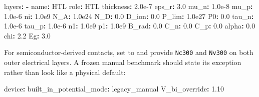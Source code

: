 \documentclass[
  11pt,
  american,
]{report}
\newenvironment{Shaded}{}{}
\newcommand{\AttributeTok}[1]{\textcolor[rgb]{0.49,0.56,0.16}{#1}}
\newcommand{\FloatTok}[1]{\textcolor[rgb]{0.25,0.63,0.44}{#1}}
\newcommand{\FunctionTok}[1]{\textcolor[rgb]{0.02,0.16,0.49}{#1}}
\newcommand{\KeywordTok}[1]{\textcolor[rgb]{0.00,0.44,0.13}{\textbf{#1}}}
\begin{document}
\begin{Shaded}
\begin{Highlighting}[]
\FunctionTok{layers}\KeywordTok{:}
\AttributeTok{  }\KeywordTok{{-}}\AttributeTok{ }\FunctionTok{name}\KeywordTok{:}\AttributeTok{ HTL}
\AttributeTok{    }\FunctionTok{role}\KeywordTok{:}\AttributeTok{ HTL}
\AttributeTok{    }\FunctionTok{thickness}\KeywordTok{:}\AttributeTok{ }\FloatTok{2.0e{-}7}
\AttributeTok{    }\FunctionTok{eps\_r}\KeywordTok{:}\AttributeTok{ }\FloatTok{3.0}
\AttributeTok{    }\FunctionTok{mu\_n}\KeywordTok{:}\AttributeTok{ }\FloatTok{1.0e{-}8}
\AttributeTok{    }\FunctionTok{mu\_p}\KeywordTok{:}\AttributeTok{ }\FloatTok{1.0e{-}6}
\AttributeTok{    }\FunctionTok{ni}\KeywordTok{:}\AttributeTok{ }\FloatTok{1.0e9}
\AttributeTok{    }\FunctionTok{N\_A}\KeywordTok{:}\AttributeTok{ }\FloatTok{1.0e24}
\AttributeTok{    }\FunctionTok{N\_D}\KeywordTok{:}\AttributeTok{ }\FloatTok{0.0}
\AttributeTok{    }\FunctionTok{D\_ion}\KeywordTok{:}\AttributeTok{ }\FloatTok{0.0}
\AttributeTok{    }\FunctionTok{P\_lim}\KeywordTok{:}\AttributeTok{ }\FloatTok{1.0e27}
\AttributeTok{    }\FunctionTok{P0}\KeywordTok{:}\AttributeTok{ }\FloatTok{0.0}
\AttributeTok{    }\FunctionTok{tau\_n}\KeywordTok{:}\AttributeTok{ }\FloatTok{1.0e{-}6}
\AttributeTok{    }\FunctionTok{tau\_p}\KeywordTok{:}\AttributeTok{ }\FloatTok{1.0e{-}6}
\AttributeTok{    }\FunctionTok{n1}\KeywordTok{:}\AttributeTok{ }\FloatTok{1.0e9}
\AttributeTok{    }\FunctionTok{p1}\KeywordTok{:}\AttributeTok{ }\FloatTok{1.0e9}
\AttributeTok{    }\FunctionTok{B\_rad}\KeywordTok{:}\AttributeTok{ }\FloatTok{0.0}
\AttributeTok{    }\FunctionTok{C\_n}\KeywordTok{:}\AttributeTok{ }\FloatTok{0.0}
\AttributeTok{    }\FunctionTok{C\_p}\KeywordTok{:}\AttributeTok{ }\FloatTok{0.0}
\AttributeTok{    }\FunctionTok{alpha}\KeywordTok{:}\AttributeTok{ }\FloatTok{0.0}
\AttributeTok{    }\FunctionTok{chi}\KeywordTok{:}\AttributeTok{ }\FloatTok{2.2}
\AttributeTok{    }\FunctionTok{Eg}\KeywordTok{:}\AttributeTok{ }\FloatTok{3.0}
\end{Highlighting}
\end{Shaded}

For semiconductor-derived contacts, set 
to  and provide \texttt{Nc300} and
\texttt{Nv300} on both outer electrical layers. A frozen manual
benchmark should state its exception rather than look like a physical
default:

\begin{Shaded}
\begin{Highlighting}[]
\FunctionTok{device}\KeywordTok{:}
\AttributeTok{  }\FunctionTok{built\_in\_potential\_mode}\KeywordTok{:}\AttributeTok{ legacy\_manual}
\AttributeTok{  }\FunctionTok{V\_bi\_override}\KeywordTok{:}\AttributeTok{ }\FloatTok{1.10}
\end{Highlighting}
\end{Shaded}
\end{document}
